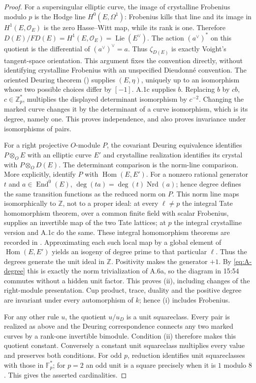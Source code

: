 \begin{proof}
For a supersingular elliptic curve, the image of crystalline Frobenius
modulo $p$ is the Hodge line $H^0(E,\Omega^1)$: Frobenius kills
that line and its image in $H^1(E,\mathcal O_E)$ is the zero
Hasse--Witt map, while its rank is one. Therefore
$D(E)/FD(E)=H^1(E,\mathcal O_E)=\operatorname{Lie}(E^\vee)$.
The action $(a^\vee)^*$ on this quotient is the differential of
$(a^\vee)^\vee=a$. Thus $\zeta_{D(E)}$ is exactly Voight's
tangent-space orientation. This argument fixes the convention directly,
without identifying crystalline Frobenius with an unspecified
Dieudonné convention.
The oriented Deuring theorem (\citealp[Proposition 42.4.8]{Voight2021})
supplies $(E,\eta)$, uniquely up to an isomorphism whose two possible
choices differ by $[-1]$. A.1c supplies $b$. Replacing $b$ by $cb$,
$c\in\mathbb Z_p^*$, multiplies the displayed determinant isomorphism
by $c^{-2}$. Changing the marked curve changes it by the determinant
of a curve isomorphism, which is its degree, namely one. This proves
independence, and also proves invariance under isomorphisms of pairs.

For a right projective $O$-module $P$, the covariant Deuring equivalence
identifies $P\otimes_OE$ with an elliptic curve $E'$ and crystalline
realization identifies its crystal with $P\otimes_OD(E)$. The determinant
comparison is the norm-line comparison. More explicitly, identify
$P$ with $\operatorname{Hom}(E,E')$. For a nonzero rational generator
$t$ and $a\in\operatorname{End}^0(E)$,
$\deg(ta)=\deg(t)\operatorname{Nrd}(a)$; hence degree defines the same
transition functions as the reduced norm on $P$. This norm line maps
isomorphically to $\mathbb Z$, not to a proper ideal: at every
$\ell\ne p$ the integral Tate homomorphism theorem, over a common
finite field with scalar Frobenius, supplies an invertible map of
the two Tate lattices; at $p$ the integral crystalline version and
A.1c do the same. These integral homomorphism theorems are recorded
in \citet[\S1.1--1.2, pp.\ 524--525]{Waterhouse1969}.
Approximating each such local map by a global element of
$\operatorname{Hom}(E,E')$ yields an isogeny of degree prime to that
particular $\ell$. Thus the degrees generate the unit ideal in
$\mathbb Z$. Positivity makes the generator $+1$.
By \eqref{eq:A-degree} this is exactly the norm trivialization of
A.6a, so the diagram in 15:54 commutes without a hidden unit factor.
This proves (ii), including changes of the right-module presentation.
Cup product, trace, duality and the positive degree are invariant under
every automorphism of $k$; hence (i) includes Frobenius.

For any other rule $u$, the quotient $u/u_D$ is a unit squareclass.
Every pair is realized as above and the Deuring correspondence connects
any two marked curves by a rank-one invertible bimodule. Condition (ii)
therefore makes this quotient constant. Conversely a constant unit
squareclass multiplies every value and preserves both conditions.
For odd $p$, reduction identifies unit squareclasses with those in
$\mathbb F_p^*$; for $p=2$ an odd unit is a square precisely when it
is $1$ modulo $8$. This gives the asserted cardinalities.
\end{proof}

